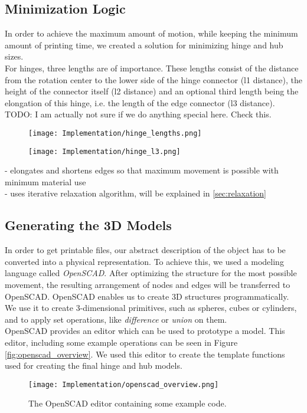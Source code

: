 \subsection{Minimization Logic}
In order to achieve the maximum amount of motion, while keeping the minimum amount of printing time, we created a solution for minimizing hinge and hub sizes.\\
For hinges, three lengths are of importance. These lengths consist of the distance from the rotation center to the lower side of the hinge connector (l1 distance), the height of the connector itself (l2 distance) and an optional third length being the elongation of this hinge, i.e. the length of the edge connector (l3 distance).
TODO: I am actually not sure if we do anything special here. Check this.
\begin{figure}[ht]
  \centering
  \begin{minipage}[t]{5cm}
    \centering
    \texttt{[image: Implementation/hinge\_lengths.png]}
    \label{fig:leg_asset}
  \end{minipage}%
  \vspace{3cm}
  \begin{minipage}[t]{5cm}
    \centering
    \texttt{[image: Implementation/hinge\_l3.png]}
    \label{fig:spider_in_progress}
  \end{minipage}
\end{figure}
- elongates and shortens edges so that maximum movement is possible with minimum material use\\
- uses iterative relaxation algorithm, will be explained in \ref{sec:relaxation}

\subsection{Generating the 3D Models}\label{sec:openscad_impl}
In order to get printable files, our abstract description of the object has to be converted into a physical representation. To achieve this, we used a modeling language called \textit{OpenSCAD}. After optimizing the structure for the most possible movement, the resulting arrangement of nodes and edges will be transferred to OpenSCAD. OpenSCAD enables us to create 3D structures programmatically. We use it to create 3-dimensional primitives, such as spheres, cubes or cylinders, and to apply set operations, like \textit{difference} or \textit{union} on them.\\
OpenSCAD provides an editor which can be used to prototype a model. This editor, including some example operations can be seen in Figure \ref{fig:openscad_overview}. We used this editor to create the template functions used for creating the final hinge and hub models.
\begin{figure}[h!]
    \texttt{[image: Implementation/openscad\_overview.png]}
    \centering
    \caption{The OpenSCAD editor containing some example code.}
    \label{fig:force_measurement}
\end{figure}
